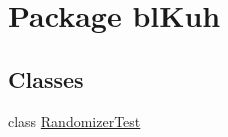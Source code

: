 \hypertarget{namespacebl_kuh}{\section{Package bl\-Kuh}
\label{namespacebl_kuh}
}
\subsection*{Classes}
\begin{DoxyCompactItemize}
\item 
class \hyperlink{classbl_kuh_1_1_randomizer_test}{Randomizer\-Test}
\end{DoxyCompactItemize}

